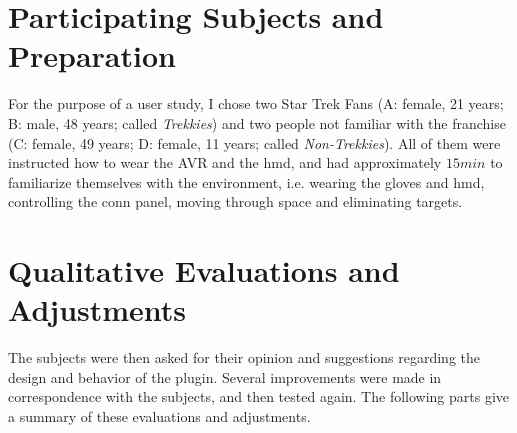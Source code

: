 \documentclass[hyperref, bachelorofscience]{cgvpub}
\begin{document}
\section{Participating Subjects and Preparation}
For the purpose of a user study, I chose two Star Trek Fans (A: female, 21 years; B: male, 48 years; called \emph{Trekkies}) and two people not familiar with the franchise (C: female, 49 years; D: female, 11 years; called \emph{Non-Trekkies}). All of them were instructed how to wear the \Gls{AVR} and the \acrshort{hmd}, and had approximately $ 15min $ to familiarize themselves with the environment, i.e. wearing the gloves and \acrshort{hmd}, controlling the conn panel, moving through space and eliminating targets. 

\section{Qualitative Evaluations and Adjustments}
The subjects were then asked for their opinion and suggestions regarding the design and behavior of the plugin. Several improvements were made in correspondence with the subjects, and then tested again. The following parts give a summary of these evaluations and adjustments.
\end{document}
